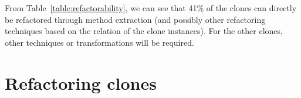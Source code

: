 From Table~\ref{table:refactorability}, we can see that 41\% of the clones can directly be refactored through method extraction (and possibly other refactoring techniques based on the relation of the clone instances). For the other clones, other techniques or transformations will be required.

\section{Refactoring clones}
